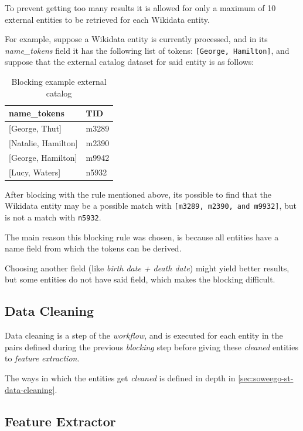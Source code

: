 \documentclass[epsfig,a4paper,11pt,titlepage,twoside,openany]{book}
\begin{document}
To prevent getting too many results it is allowed for only a maximum of 10 external entities to be retrieved for each Wikidata entity.

For example, suppose a Wikidata entity is currently processed, and in its \textit{name\_tokens} field it has the following list of tokens: \texttt{[George, Hamilton]}, and suppose that the external catalog dataset for said entity is as follows:

\begin{table}[H]
\centering
\begin{tabular}{l|l}
name\_tokens        & TID   \\ \hline
{[George, Thut]}      & m3289 \\
{[Natalie, Hamilton]} & m2390 \\
{[George, Hamilton]}  & m9942 \\
{[Lucy, Waters]}      & n5932
\end{tabular}
\caption{Blocking example external catalog}
\label{tab:soweego-blocking-ex}
\end{table}

After blocking with the rule mentioned above, its possible to find that the Wikidata entity may be a possible match with \texttt{[m3289, m2390, and m9932]}, but is not a match with \texttt{n5932}.

The main reason this blocking rule was chosen, is because all entities have a name field from which the tokens can be derived.  

Choosing another field (like \textit{birth date + death date}) might yield better results, but some entities do not have said field, which makes the blocking difficult. 

\subsection{Data Cleaning}
\label{sec:soweego-st-data-cleaning}

Data cleaning is a step of the \textit{workflow}, and is executed for each entity in the pairs defined during the previous \textit{blocking} step before giving these \textit{cleaned} entities to \textit{feature extraction}. 

The ways in which the entities get \textit{cleaned} is defined in depth in \autoref{sec:soweego-st-data-cleaning}. 


\subsection{Feature Extractor}
\label{sec:soweego-st-feature-ext}
\end{document}

